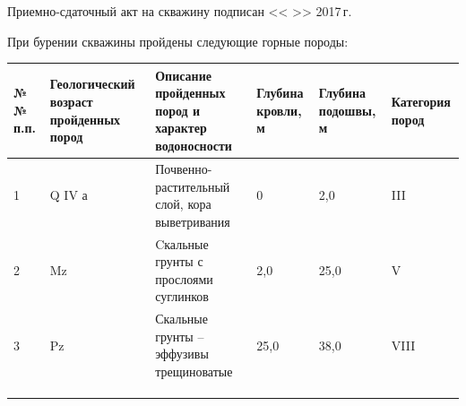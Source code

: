 \documentclass[a4paper,12pt]{article} %
\newcommand{\txtYear}{2017}			%
\begin{document}
	Приемно-сдаточный акт на скважину подписан << >> \txtYear \,г.
	
	\bigskip
	
	При бурении скважины пройдены следующие горные породы:

	\begin{table}[]\footnotesize
	\centering
	\begin{tabular}[c]{|@{}p{1cm}|@{}p{2.5cm}|@{}p{8cm}|@{}p{1.5cm}|@{}p{1.5cm}|@{}p{1.5cm}|}
		\hline 
		№№ п.п. & Геологический возраст пройденных пород & Описание пройденных пород и характер водоносности & Глубина кровли, м & Глубина подошвы, м & Категория пород \\ 
		\hline 
		1 & Q IV а & Почвенно-растительный слой, кора выветривания & 0 & 2,0 & III\\ 
		\hline 
		2 & Mz & Cкальные грунты с прослоями суглинков & 2,0 & 25,0 & V \\ 
		\hline 
		3 & Pz & Скальные грунты – эффузивы трещиноватые & 25,0 & 38,0 & VIII \\ 
		\hline 
		&  &  &  &  &  \\ 
		\hline 
		&  &  &  &  &  \\ 
		\hline 
		&  &  &  &  &  \\ 
		\hline 
	\end{tabular} 
	\end{table}

	\bigskip
	
\end{document}
